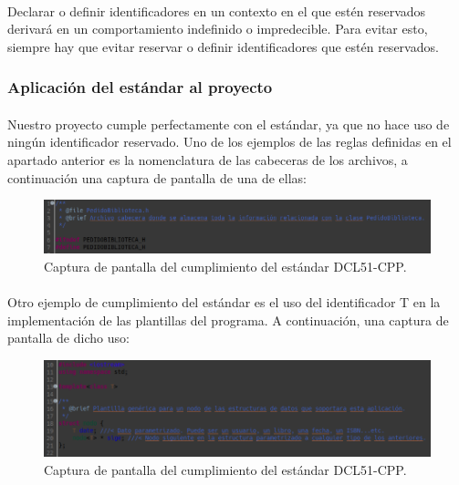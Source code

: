 			\paragraph{}Declarar o definir identificadores en un contexto en el que estén reservados derivará en un comportamiento indefinido o impredecible. Para evitar esto, siempre hay que evitar reservar o definir identificadores que estén reservados.
		
		\subsubsection{Aplicación del estándar al proyecto}
		
			\paragraph{}Nuestro proyecto cumple perfectamente con el estándar, ya que no hace uso de ningún identificador reservado. Uno de los ejemplos de las reglas definidas en el apartado anterior es la nomenclatura de las cabeceras de los archivos, a continuación una captura de pantalla de una de ellas:
			
			\begin{figure}[H]
				\centering
				\includegraphics[scale=0.5]{img/captura40.png}
				\caption{Captura de pantalla del cumplimiento del estándar DCL51-CPP.}
				\label{captura40}
			\end{figure}
		
			\paragraph{}Otro ejemplo de cumplimiento del estándar es el uso del identificador T en la implementación de las plantillas del programa. A continuación, una captura de pantalla de dicho uso:
			
			\begin{figure}[H]
				\centering
				\includegraphics[scale=0.5]{img/captura41.png}
				\caption{Captura de pantalla del cumplimiento del estándar DCL51-CPP.}
				\label{captura41}
			\end{figure}
		

